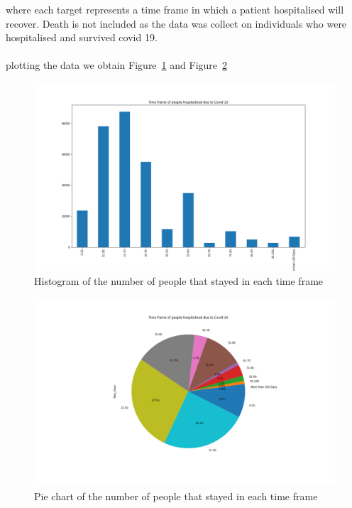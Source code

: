 \documentclass[fleqn]{article}
\begin{document}
			where each target represents a time frame in which a patient hospitalised will recover. Death is not included as the data was collect on individuals 					who were hospitalised and survived covid 19.\\
			\\plotting the data we obtain Figure~\ref{fig:1} and Figure~\ref{fig:2}\\			
			\begin{figure}[hb]
  				\includegraphics[width=\linewidth]{clas_hist.png}
  				\caption{Histogram of the number of people that stayed in each time 						frame}
  			\label{fig:1}
			\end{figure}
			\FloatBarrier
			\begin{figure}[hb]
  				\includegraphics[width=\linewidth]{class_pie.png}
  				\caption{Pie chart of the number of people that stayed in each time 						frame}
  				\label{fig:2}
			\end{figure} 
			\FloatBarrier
			
\end{document}
